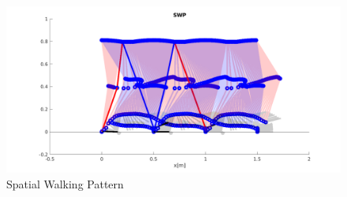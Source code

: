 \documentclass[a4paper]{article}
\begin{document}
\begin{figure}
\center
\includegraphics[scale=0.5]{plot/kinematic/SPW.pdf} 
\caption{Spatial Walking Pattern} 
\label{fig:SPW}
\end{figure}


 
\end{document}

